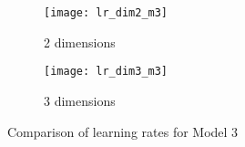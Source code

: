 
\label{appendix}

\begin{figure}
	\centering
	\begin{subfigure}{.5\textwidth}
		\centering
		\texttt{[image: lr\_dim2\_m3]}
		\caption{2 dimensions}
	\end{subfigure}%
	\begin{subfigure}{.5\textwidth}
		\centering
		\texttt{[image: lr\_dim3\_m3]}
		\caption{3 dimensions}
	\end{subfigure}
	\caption{Comparison of learning rates for Model 3}
	\label{fig:comp_lr_m3}
\end{figure}


\clearpage
